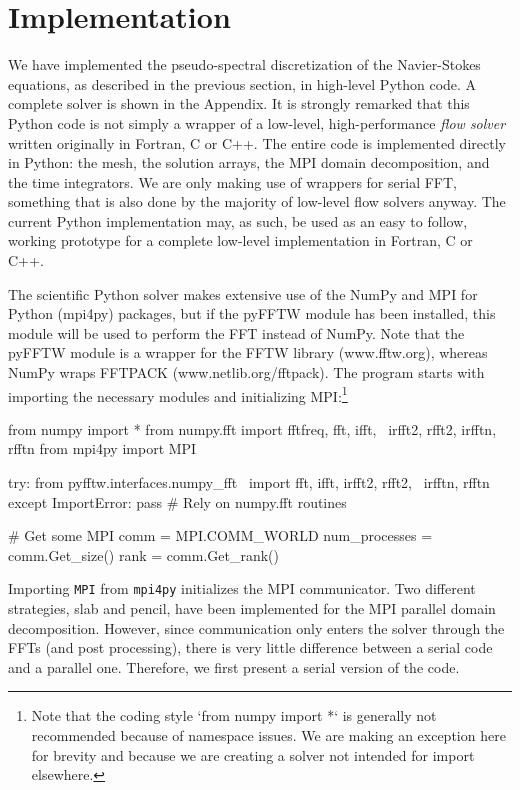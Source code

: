 \documentclass[final,3p,times,twocolumn]{elsarticle}
\begin{document}
\section{Implementation}

We have implemented the pseudo-spectral discretization of the Navier-Stokes equations, as described in the previous section, in high-level Python code. A complete solver is shown in the Appendix. It is strongly remarked that this Python code is not simply a wrapper of a low-level, high-performance \emph{flow solver} written originally in Fortran, C or C++. The entire code is implemented directly in Python: the mesh, the solution arrays, the MPI domain decomposition, and the time integrators. We are only making use of wrappers for serial FFT, something that is also done by the majority of low-level flow solvers anyway. The current Python implementation may, as such, be used as an easy to follow, working prototype for a complete low-level implementation in Fortran, C or C++.

The scientific Python solver makes extensive use of the NumPy and MPI for 
Python (mpi4py) 
packages, but if the pyFFTW  module has been installed, this module 
will be used to perform the FFT instead of NumPy. Note that the 
pyFFTW module is a wrapper for the FFTW library (www.fftw.org), 
whereas NumPy wraps FFTPACK (www.netlib.org/fftpack).  The 
program starts with importing the necessary modules and initializing 
MPI:\footnote{Note that the coding style `from numpy import *` is generally not 
recommended because of namespace issues. We are making an exception here for 
brevity and because we are creating a solver not intended for import elsewhere.}

\begin{python}
from numpy import *
from numpy.fft import fftfreq, fft, ifft, \
  irfft2, rfft2, irfftn, rfftn
from mpi4py import MPI

try:
    from pyfftw.interfaces.numpy_fft \ 
    import fft, ifft, irfft2, rfft2, \
    irfftn, rfftn
except ImportError:
    pass # Rely on numpy.fft routines

# Get some MPI     
comm = MPI.COMM_WORLD
num_processes = comm.Get_size()
rank = comm.Get_rank()         
\end{python}
Importing \texttt{MPI} from \texttt{mpi4py} initializes the MPI communicator. 
Two different strategies, slab and pencil, have been implemented for the MPI 
parallel domain decomposition. However, since communication only enters the 
solver through the FFTs (and post processing), there is very little difference 
between a serial code and a parallel one. Therefore, we first present a serial 
version of the code.
\end{document}
